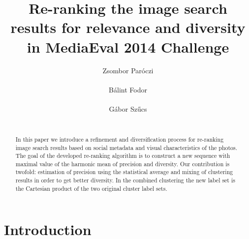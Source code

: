 \documentclass{acm_proc_article-me}
\begin{document}

\title{Re-ranking the image search results for relevance and diversity in MediaEval 2014 Challenge}


\author{
\alignauthor
Zsombor Par\'oczi\\
       \\
\alignauthor
B\'alint Fodor\\
       \\
\alignauthor
G\'abor Sz\H ucs \\
       \\
}

\maketitle
\begin{abstract}

In this paper we introduce a refinement and diversification process for re-ranking image search results based on social metadata and visual characteristics of the photos.
The goal of the developed re-ranking algorithm is to construct a new sequence with maximal
value of the harmonic mean of precision and diversity. Our contribution is twofold: estimation of precision using the statistical average and mixing of clustering results in order to get better diversity. In the combined clustering the new label set is the Cartesian product of the two original cluster label sets.

\end{abstract}

\section{Introduction}
\end{document}
